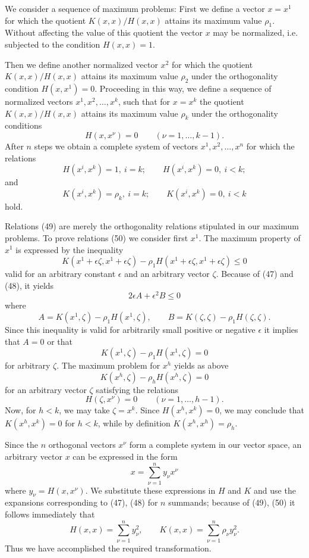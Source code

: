 We consider a sequence of maximum problems: First we define a vector $x=x^1$ for which the quotient $K(x,x)/H(x,x)$ attains its maximum value $\rho_1$. Without affecting the value of this quotient the vector $x$ may be normalized, i.e. subjected to the condition $H(x,x)=1$.

Then we define another normalized vector $x^2$ for which the quotient $K(x,x)/H(x,x)$ attains its maximum value $\rho_2$ under the orthogonality condition $H(x,x^1)=0$. Proceeding in this way, we define a sequence of normalized vectors $x^1,x^2,\ldots,x^k$, such that for $x=x^k$ the quotient $K(x,x)/H(x,x)$ attains its maximum value $\rho_k$ under the orthogonality conditions
\[H(x,x^\nu)=0\qquad(\nu=1,\ldots,k-1).\]
After $n$ steps we obtain a complete system of vectors $x^1,x^2,\ldots,x^n$ for which the relations
\begin{equation*}H(x^i,x^k)=1,\ i=k;\qquad H(x^i,x^k)=0,\ i<k;\tag{49}\end{equation*}
and
\begin{equation*}K(x^i,x^k)=\rho_k,\ i=k;\qquad K(x^i,x^k)=0,\ i<k\tag{50}\end{equation*}
hold.

Relations (49) are merely the orthogonality relations stipulated in our maximum problems. To prove relations (50) we consider first $x^1$. The maximum property of $x^1$ is expressed by the inequality
\[K(x^1+\epsilon\zeta,x^1+\epsilon\zeta)-\rho_1H(x^1+\epsilon\zeta,x^1+\epsilon\zeta)\le0\]
valid for an arbitrary constant $\epsilon$ and an arbitrary vector $\zeta$. Because of (47) and (48), it yields
\[2\epsilon A+\epsilon^2B\le0\]
where
\[A=K(x^1,\zeta)-\rho_1H(x^1,\zeta),\qquad B=K(\zeta,\zeta)-\rho_1H(\zeta,\zeta).\]
Since this inequality is valid for arbitrarily small positive or negative $\epsilon$ it implies that $A=0$ or that
\begin{equation*}K(x^1,\zeta)-\rho_1H(x^1,\zeta)=0\tag{51}\end{equation*}
for arbitrary $\zeta$. The maximum problem for $x^h$ yields as above
\[K(x^h,\zeta)-\rho_hH(x^h,\zeta)=0\]
for an arbitrary vector $\zeta$ satisfying the relations
\[H(\zeta,x^\nu)=0\qquad(\nu=1,\ldots,h-1).\]
Now, for $h<k$, we may take $\zeta=x^k$. Since $H(x^h,x^k)=0$, we may conclude that $K(x^h,x^k)=0$ for $h<k$, while by definition $K(x^h,x^h)=\rho_h$.

Since the $n$ orthogonal vectors $x^\nu$ form a complete system in our vector space, an arbitrary vector $x$ can be expressed in the form
\[x=\sum_{\nu=1}^{n}y_\nu x^\nu\]
where $y_\nu=H(x,x^\nu)$. We substitute these expressions in $H$ and $K$ and use the expansions corresponding to (47), (48) for $n$ summands; because of (49), (50) it follows immediately that
\[H(x,x)=\sum_{\nu=1}^{n}y_\nu^2,\qquad K(x,x)=\sum_{\nu=1}^{n}\rho_\nu y_\nu^2.\]
Thus we have accomplished the required transformation.

